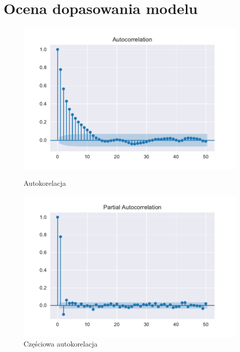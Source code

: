 \documentclass{article}
\theoremstyle{break}
\begin{document}
\section{Ocena dopasowania modelu}
\begin{figure}[H]
	\begin{center}
		\begin{minipage}{0.49\linewidth}
			\centering
			\includegraphics[scale=0.49]{acf2.pdf}
			\caption{Autokorelacja}
			\label{fig:acf2}
		\end{minipage}
		\begin{minipage}{0.49\linewidth}
			\centering
			\includegraphics[scale=0.49]{pacf2.pdf}
			\caption{Częściowa autokorelacja}
			\label{fig:pacf2}
		\end{minipage}
	\end{center}
\end{figure}
\end{document}
